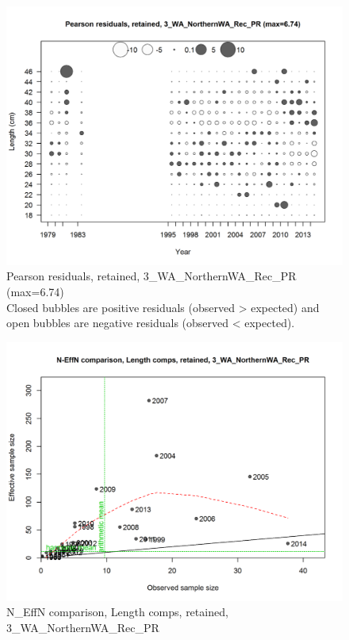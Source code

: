 \documentclass[12pt,]{article}
\begin{document}
\begin{figure}[htbp]
\centering
\includegraphics{./r4ss/plots_mod1/comp_lenfit_residsflt3mkt2.png}
\caption{Pearson residuals, retained, 3\_WA\_NorthernWA\_Rec\_PR
(max=6.74)\\
Closed bubbles are positive residuals (observed \textgreater{} expected)
and open bubbles are negative residuals (observed \textless{} expected).
\label{fig:mod1_6_comp_lenfit_residsflt3mkt2}}
\end{figure}

\begin{figure}[htbp]
\centering
\includegraphics{./r4ss/plots_mod1/comp_lenfit_sampsize_flt3mkt2.png}
\caption{N\_EffN comparison, Length comps, retained,
3\_WA\_NorthernWA\_Rec\_PR
\label{fig:mod1_7_comp_lenfit_sampsize_flt3mkt2}}
\end{figure}
\end{document}
